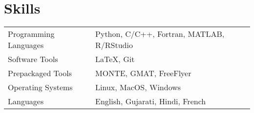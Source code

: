 \documentclass[letterpaper,12pt]{article}
\begin{document}
\section{Skills}
\begin{tabularx}{\linewidth}{@{}l X@{}}
Programming Languages  &  Python, C/C++, Fortran, MATLAB, R/RStudio \\[3.75pt]
Software Tools         &  \LaTeX, Git                               \\[3.75pt]
Prepackaged Tools      &  MONTE, GMAT, FreeFlyer                    \\[3.75pt]
Operating Systems      &  Linux, MacOS, Windows                     \\[3.75pt]
Languages              &  English, Gujarati, Hindi, French          \\[3.75pt]
\end{tabularx}

\end{document}
